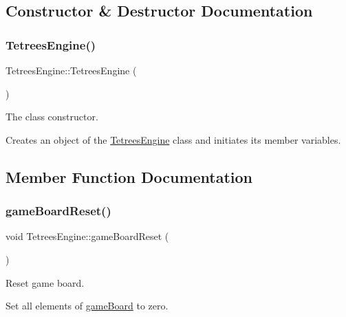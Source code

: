 \subsection{Constructor \& Destructor Documentation}
\mbox{\label{classTetreesEngine_ada1775237223604c895a50625eda1d49}} 
\subsubsection{\texorpdfstring{Tetrees\+Engine()}{TetreesEngine()}}
{\footnotesize\ttfamily Tetrees\+Engine\+::\+Tetrees\+Engine (\begin{DoxyParamCaption}{ }\end{DoxyParamCaption})}



The class constructor. 

Creates an object of the \hyperlink{classTetreesEngine}{Tetrees\+Engine} class and initiates its member variables. 

\subsection{Member Function Documentation}
\mbox{\label{classTetreesEngine_ad28ed83be446f74c87d55d79cc64e6ef}} 
\subsubsection{\texorpdfstring{game\+Board\+Reset()}{gameBoardReset()}}
{\footnotesize\ttfamily void Tetrees\+Engine\+::game\+Board\+Reset (\begin{DoxyParamCaption}{ }\end{DoxyParamCaption})\hspace{0.3cm}{\ttfamily [private]}}



Reset game board. 

Set all elements of \hyperlink{classTetreesEngine_a37d082a7816d6731b2703dd6d1a1cb97}{game\+Board} to zero. \mbox{\label{classTetreesEngine_a33e9983a618b3538640b6bd987304b8b}} 
